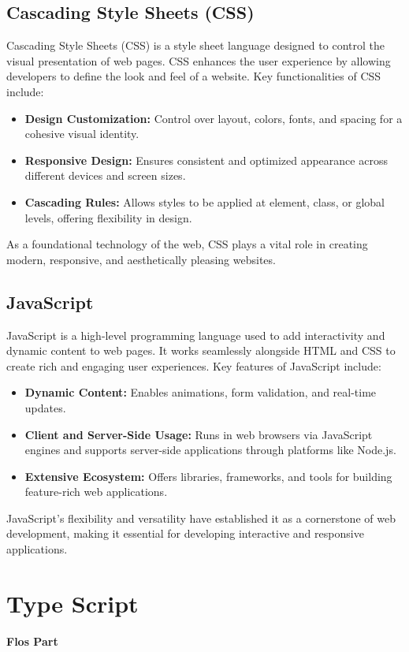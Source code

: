 \cite{HTML-Wikipedia}

\subsection{Cascading Style Sheets (CSS)}

Cascading Style Sheets (CSS) is a style sheet language designed to control the visual presentation of web pages. CSS enhances the user experience by allowing developers to define the look and feel of a website. Key functionalities of CSS include:

\begin{itemize}
    \item \textbf{Design Customization:} Control over layout, colors, fonts, and spacing for a cohesive visual identity.
    \item \textbf{Responsive Design:} Ensures consistent and optimized appearance across different devices and screen sizes.
    \item \textbf{Cascading Rules:} Allows styles to be applied at element, class, or global levels, offering flexibility in design.
\end{itemize}

As a foundational technology of the web, CSS plays a vital role in creating modern, responsive, and aesthetically pleasing websites.

\cite{CSS-Wikipedia}

\subsection{JavaScript}

JavaScript is a high-level programming language used to add interactivity and dynamic content to web pages. It works seamlessly alongside HTML and CSS to create rich and engaging user experiences. Key features of JavaScript include:

\begin{itemize}
    \item \textbf{Dynamic Content:} Enables animations, form validation, and real-time updates.
    \item \textbf{Client and Server-Side Usage:} Runs in web browsers via JavaScript engines and supports server-side applications through platforms like Node.js.
    \item \textbf{Extensive Ecosystem:} Offers libraries, frameworks, and tools for building feature-rich web applications.
\end{itemize}

JavaScript’s flexibility and versatility have established it as a cornerstone of web development, making it essential for developing interactive and responsive applications.

\cite{JavaScript-Wikipedia}

\section{Type Script}

\textbf{Flos Part}

